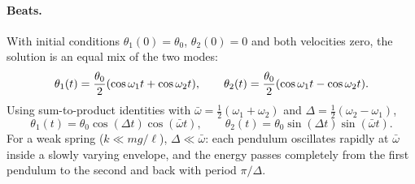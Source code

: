 \documentclass[11pt]{article}
\theoremstyle{definition}
\begin{document}
\paragraph{Beats.} With initial conditions $\theta_1(0) = \theta_0$, $\theta_2(0) = 0$ and both velocities zero, the solution is an equal mix of the two modes:
\[
  \theta_1(t) = \frac{\theta_0}{2}\qty(\cos\omega_1 t + \cos\omega_2 t), \qquad
  \theta_2(t) = \frac{\theta_0}{2}\qty(\cos\omega_1 t - \cos\omega_2 t).
\]
Using sum-to-product identities with $\bar\omega = \tfrac12(\omega_1 + \omega_2)$ and $\Delta = \tfrac12(\omega_2 - \omega_1)$,
\[
  \theta_1(t) = \theta_0\cos(\Delta t)\cos(\bar\omega t), \qquad
  \theta_2(t) = \theta_0\sin(\Delta t)\sin(\bar\omega t).
\]
For a weak spring ($k \ll mg/\ell$), $\Delta \ll \bar\omega$: each pendulum oscillates rapidly at $\bar\omega$ inside a slowly varying envelope, and the energy passes completely from the first pendulum to the second and back with period $\pi/\Delta$.
\end{document}
